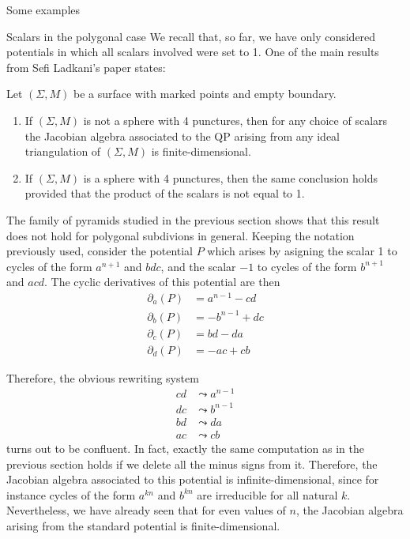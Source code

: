 \begin{chapter}{Some examples}
\begin{section}{Scalars in the polygonal case}
We recall that, so far, we have only considered potentials in which all scalars involved were set to 1. One of the main results from Sefi Ladkani's paper \cite{Lad12} states:
\begin{thm} Let $(\Sigma, M)$ be a surface with marked points and empty boundary.
\begin{enumerate}
\item If $(\Sigma, M)$ is not a sphere with 4 punctures, then for any choice of scalars the Jacobian algebra associated to the QP arising from any ideal triangulation of $(\Sigma, M)$ is finite-dimensional.
\item If $(\Sigma, M)$ is a sphere with 4 punctures, then the same conclusion holds provided that the product of the scalars is not equal to 1.
\end{enumerate}
\end{thm}

The family of pyramids studied in the previous section shows that this result does not hold for polygonal subdivions in general. Keeping the notation previously used, consider the potential $P$ which arises by asigning the scalar 1 to cycles of the form $a^{n+1}$ and $bdc$, and the scalar $-1$ to cycles of the form $b^{n+1}$ and $acd$. The cyclic derivatives of this potential are then
\begin{align*}
\partial_a(P) &= a^{n-1} - cd\\
\partial_b(P) &= -b^{n-1} + dc\\
\partial_c(P) &= bd - da\\
\partial_d(P) &= -ac + cb
\end{align*}

Therefore, the obvious rewriting system
\begin{align*}
cd &\leadsto a^{n-1}\tag{$\partial_a$}\\
dc &\leadsto b^{n-1}\tag{$\partial_b$}\\
bd &\leadsto da\tag{$\partial_c$}\\
ac &\leadsto cb\tag{$\partial_d$}
\end{align*}
turns out to be confluent. In fact, exactly the same computation as in the previous section holds if we delete all the minus signs from it. Therefore, the Jacobian algebra associated to this potential is infinite-dimensional, since for instance cycles of the form $a^{kn}$ and $b^{kn}$ are irreducible for all natural $k$. Nevertheless, we have already seen that for even values of $n$, the Jacobian algebra arising from the standard potential is finite-dimensional.
\end{section}


\end{chapter}
